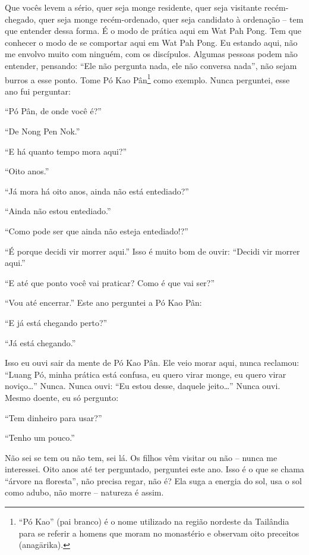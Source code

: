 Que vocês levem a sério, quer seja monge residente, quer seja
visitante recém-chegado, quer seja monge recém-ordenado, quer seja
candidato à ordenação – tem que entender dessa forma. É o modo de
prática aqui em Wat Pah Pong. Tem que conhecer o modo de se comportar
aqui em Wat Pah Pong. Eu estando aqui, não me envolvo muito com
ninguém, com os discípulos. Algumas pessoas podem não entender,
pensando: “Ele não pergunta nada, ele não conversa nada”, não sejam
burros a esse ponto. Tome Pó Kao Pân\footnote{“Pó Kao” (pai branco) é o
nome utilizado na região nordeste da Tailândia para se referir a homens
que moram no monastério e observam oito preceitos (anagārika).} como
exemplo. Nunca perguntei, esse ano fui perguntar: 

“Pó Pân, de onde você é?” 

“De Nong Pen Nok.”

“E há quanto tempo mora aqui?”

“Oito anos.” 

“Já mora há oito anos, ainda não está entediado?” 

“Ainda não estou entediado.”

“Como pode ser que ainda não esteja entediado!?”

“É porque decidi vir morrer aqui.” Isso é muito bom de ouvir:
“Decidi vir morrer aqui.” 

“E até que ponto você vai praticar? Como é que vai ser?”

“Vou até encerrar.” Este ano perguntei a Pó Kao Pân:

“E já está chegando perto?”

“Já está chegando.” 

Isso eu ouvi sair da mente de Pó Kao Pân. Ele veio morar aqui, nunca
reclamou: “Luang Pó, minha prática está confusa, eu quero virar monge,
eu quero virar noviço…” Nunca. Nunca ouvi: “Eu estou desse, daquele
jeito…” Nunca ouvi. Mesmo doente, eu só pergunto:

“Tem dinheiro para usar?” 

“Tenho um pouco.” 

Não sei se tem ou não tem, sei lá. Os filhos vêm visitar ou não –
nunca me interessei. Oito anos até ter perguntado, perguntei este ano.
Isso é o que se chama “árvore na floresta”, não precisa regar, não é?
Ela suga a energia do sol, usa o sol como adubo, não morre – natureza é
assim.

